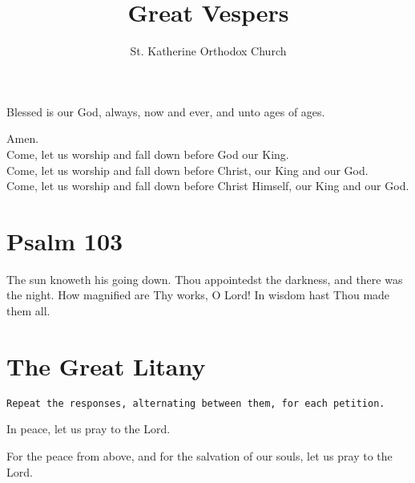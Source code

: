 \documentclass[twoside, letterpaper, 12pt]{report}
\newcommand{\instruction}[1]{%
  \texttt{\scriptsize{#1}}%
}
\newcommand{\centeredsection}[1]{%
  \needspace{10\baselineskip}%
  \section*{\centering{}#1}%
}
\begin{document}

\title{Great Vespers}
\author{St. Katherine Orthodox Church}
\date{}%
\maketitle


\begin{priest}
\item Blessed is our God, always, now and ever, and unto ages of ages.
\end{priest}

\begin{reader}
\item Amen.\\
    Come, let us worship and fall down before God our King.\\
    Come, let us worship and fall down before Christ, our King and our God.\\
    Come, let us worship and fall down before Christ Himself, our King and our God.\\
\end{reader}

\centeredsection{Psalm 103}
\begin{multicols}{2}


The sun knoweth his going down.
Thou appointedst the darkness, and there was the night.
How magnified are Thy works, O Lord! In wisdom hast Thou made them all.
\end{multicols}


\centeredsection{The Great Litany}
\instruction{Repeat the responses, alternating between them, for each petition.}
\begin{deacon}
\item In peace, let us pray to the Lord.
\end{deacon}

\begin{deacon}
\item For the peace from above, and for the salvation of our souls,
    let us pray to the Lord.
\end{deacon}
\end{document}
